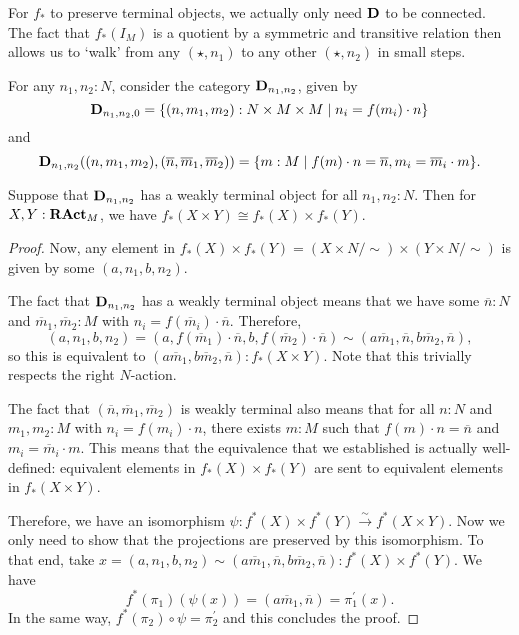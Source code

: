 \begin{remark}
  For $ f_* $ to preserve terminal objects, we actually only need $ \mathbf{D} $ to be connected. The fact that $ f_*(I_M) $ is a quotient by a symmetric and transitive relation then allows us to `walk' from any $ (\star, n_1) $ to any other $ (\star, n_2) $ in small steps.
\end{remark}

For any $ n_1, n_2: N $, consider the category $ \mathbf{D}_{n_1, n_2} $, given by
\[ \mathbf{D}_{n_1, n_2, 0} = \{ (n, m_1, m_2): N \times M \times M \mid n_i = f(m_i) \cdot n \} \]
and
\[ \mathbf{D}_{n_1, n_2}((n, m_1, m_2), (\overline n, \overline m_1, \overline m_2)) = \{ m: M \mid f(m) \cdot n = \overline n, m_i = \overline m_i \cdot m \}. \]

\begin{lemma}\label{lem:scalar-extension-product}
  Suppose that $ \mathbf{D}_{n_1, n_2} $ has a weakly terminal object for all $ n_1, n_2: N $. Then for $ X, Y : \mathbf{RAct}_{M} $, we have $ f_*(X \times Y) \cong f_*(X) \times f_*(Y) $.
\end{lemma}
\begin{proof}
  Now, any element in $ f_*(X) \times f_*(Y) = (X \times N / \sim) \times (Y \times N / \sim) $ is given by some $ (a, n_1, b, n_2) $.

  The fact that $ \mathbf{D}_{n_1, n_2} $ has a weakly terminal object means that we have some $ \overline n: N $ and $ \overline m_1, \overline m_2: M $ with $ n_i = f(\overline m_i) \cdot \overline n $. Therefore,
  \[ (a, n_1, b, n_2) = (a, f(\overline m_1) \cdot \overline n, b, f(\overline m_2) \cdot \overline n) \sim (a \overline m_1, \overline n, b \overline m_2, \overline n), \]
  so this is equivalent to $ (a \overline m_1, b \overline m_2, \overline n) : f_*(X \times Y) $. Note that this trivially respects the right $ N $-action.

  The fact that $ (\overline n, \overline m_1, \overline m_2) $ is weakly terminal also means that for all $ n: N $ and $ m_1, m_2: M $ with $ n_i = f(m_i) \cdot n $, there exists $ m: M $ such that $ f(m) \cdot n = \overline n $ and $ m_i = \overline m_i \cdot m $. This means that the equivalence that we established is actually well-defined: equivalent elements in $ f_*(X) \times f_*(Y) $ are sent to equivalent elements in $ f_*(X \times Y) $.

  Therefore, we have an isomorphism $ \psi: f^*(X) \times f^*(Y) \xrightarrow{\sim} f^*(X \times Y) $. Now we only need to show that the projections are preserved by this isomorphism. To that end, take $ x = (a, n_1, b, n_2) \sim (a \overline m_1, \overline n, b \overline m_2, \overline n) : f^*(X) \times f^*(Y) $. We have
  \[ f^*(\pi_1)(\psi(x)) = (a \overline m_1, \overline n) = \pi^\prime_1(x). \]
  In the same way, $ f^*(\pi_2) \circ \psi = \pi^\prime_2 $ and this concludes the proof.
\end{proof}


